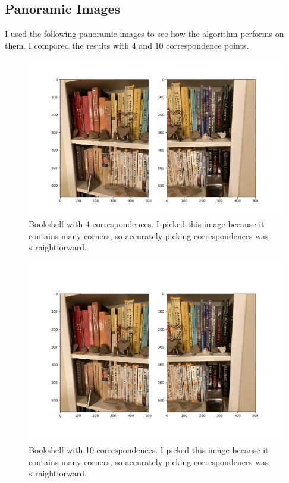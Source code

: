 \documentclass[]{article}
\begin{document}
	
	\newpage
	
	\subsection{Panoramic Images}
		I used the following panoramic images to see how the algorithm performs on them. I compared the results with 4 and 10 correspondence points.
	
	\begin{figure}[H]
		\centering
		\includegraphics[width=6.5in]{test_images/shelf_4_correspondences.png}
		\caption{Bookshelf with 4 correspondences. I picked this image because it contains many corners, so accurately picking correspondences was straightforward.}
	\end{figure}
	
	\begin{figure}[H]
		\centering
		\includegraphics[width=6.5in]{test_images/shelf_10_correspondences.png}
		\caption{Bookshelf with 10 correspondences. I picked this image because it contains many corners, so accurately picking correspondences was straightforward.}
	\end{figure}
\end{document}
